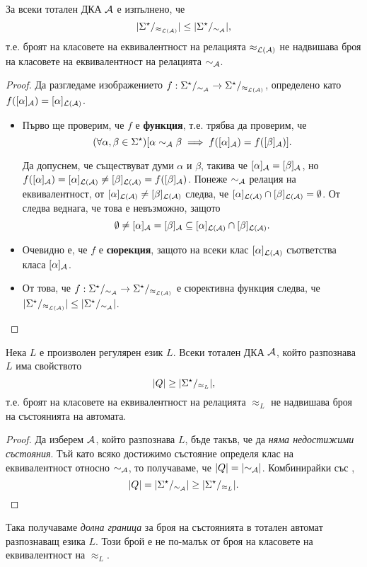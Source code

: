 \begin{cor}
  \label{cor:approx-less-sim}
  За всеки тотален ДКА $\mathcal{A}$ е изпълнено, че
  \[\lvert{\Sigma^\star/_{\approx_{\mathcal{L}(\mathcal{A})}}}\rvert \leq \lvert{\Sigma^\star/_{\sim_{\mathcal{A}}}}\rvert,\]
  т.е. броят на класовете на еквивалентност на релацията $\approx_{\mathcal{L}(\mathcal{A})}$
  не надвишава броя на класовете на еквивалентност на релацията $\sim_{\mathcal{A}}$.
\end{cor}
\begin{proof}
  Да разгледаме изображението 
  $f:\Sigma^\star/_{\sim_{\mathcal{A}}} \to \Sigma^\star/_{\approx_{\mathcal{L}(\mathcal{A})}}$, определено като $f([\alpha]_{\mathcal{A}}) = [\alpha]_{\mathcal{L}(\mathcal{A})}$.
  \begin{itemize}
  \item 
    Първо ще проверим, че $f$ е {\bf функция}, т.е. трябва да проверим, че 
    \[(\forall\alpha,\beta\in\Sigma^\star)[\alpha \sim_{\mathcal{A}} \beta \implies f([\alpha]_{\mathcal{A}}) = f([\beta]_{\mathcal{A}})].\]
    
    Да допуснем, че съществуват думи $\alpha$ и $\beta$, такива че
    $[\alpha]_{\mathcal{A}} = [\beta]_{\mathcal{A}}$, но $f([\alpha]_{\mathcal{A}}) = [\alpha]_{\mathcal{L}(\mathcal{A})} \neq [\beta]_{\mathcal{L}(\mathcal{A})} = f([\beta]_{\mathcal{A}})$.
    Понеже $\sim_{\mathcal{A}}$ релация на еквивалентност, от $[\alpha]_{\mathcal{L}(\mathcal{A})} \neq [\beta]_{\mathcal{L}(\mathcal{A})}$
    следва, че $[\alpha]_{\mathcal{L}(\mathcal{A})} \cap [\beta]_{\mathcal{L}(\mathcal{A})} = \emptyset$.
    От  следва веднага, че това е невъзможно, защото
    \[\emptyset \neq [\alpha]_{\mathcal{A}} = [\beta]_{\mathcal{A}} \subseteq [\alpha]_{\mathcal{L}(\mathcal{A})} \cap [\beta]_{\mathcal{L}(\mathcal{A})}.\]
  \item
    Очевидно е, че $f$ е {\bf сюрекция}, защото на всеки клас $[\alpha]_{\mathcal{L}(\mathcal{A})}$ съответства класа $[\alpha]_{\mathcal{A}}$.
  \item
    От това, че $f:\Sigma^\star/_{\sim_{\mathcal{A}}} \to \Sigma^\star/_{\approx_{\mathcal{L}(\mathcal{A})}}$ е сюрективна функция следва, че 
    $\lvert{\Sigma^\star/_{\approx_{\mathcal{L}(\mathcal{A})}}}\rvert \leq \lvert{\Sigma^\star/_{\sim_{\mathcal{A}}}}\rvert$.
  \end{itemize}
\end{proof}

\begin{cor}
  \label{cor:upper-bound}
  Нека $L$ е произволен регулярен език $L$.  
  Всеки тотален ДКА $\mathcal{A}$, който разпознава $L$ има свойството
  \[\lvert{Q}\rvert \geq \lvert{\Sigma^\star/_{\approx_L}}\rvert,\]
  т.е. броят на класовете на еквивалентност на релацията $\approx_L$
  не надвишава броя на състоянията на автомата.
\end{cor}
\begin{proof}
  Да изберем $\mathcal{A}$, който разпознава $L$, бъде такъв, че да {\em няма недостижими състояния}.
  Тъй като всяко достижимо състояние определя клас на еквивалентност относно $\sim_{\mathcal{A}}$,
  то получаваме, че $\lvert{Q}\rvert = \lvert{\sim_{\mathcal{A}}}\rvert$.
  Комбинирайки със ,
  \[\lvert{Q}\rvert = \lvert{\Sigma^\star/_{\sim_{\mathcal{A}}}}\rvert \geq \lvert{\Sigma^\star/_{\approx_L}}\rvert.\]
\end{proof}
Така получаваме {\em долна граница} за броя на състоянията в тотален автомат разпознаващ езика $L$.
Този брой е не по-малък от броя на класовете на еквивалентност на $\approx_L$.


